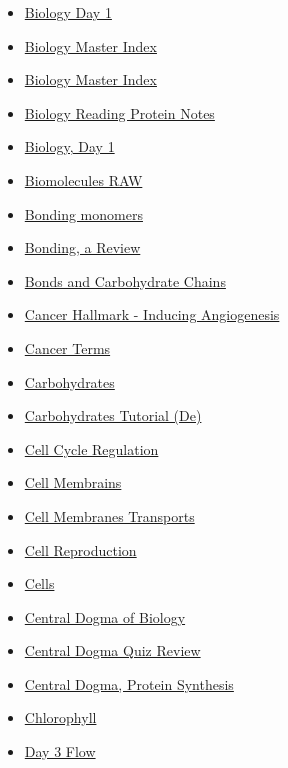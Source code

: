 \documentclass[11pt]{article}
\begin{document}
\begin{itemize}
\begin{itemize}
\begin{itemize}
\item \href{biology/bio10/KBhBIO101Day1.org}{Biology Day 1}
\item \href{biology/bio10/index.org}{Biology Master Index}
\item \href{biology/bio10/KBBiologyMasterIndex.org}{Biology Master Index}
\item \href{biology/bio10/KBBIO101ProteinReading.org}{Biology Reading Protein Notes}
\item \href{biology/bio10/KBhBIO101LetsDoBio.org}{Biology, Day 1}
\item \href{biology/bio10/KBhBIO201BioMoleculesRAW.org}{Biomolecules RAW}
\item \href{biology/bio10/KBe20bio101refBondingMonomers.org}{Bonding monomers}
\item \href{biology/bio10/KBhBIO101BondingReview.org}{Bonding, a Review}
\item \href{biology/bio10/KB20200911095443.org}{Bonds and Carbohydrate Chains}
\item \href{biology/bio10/cancer\_angiogenesis.org}{Cancer Hallmark - Inducing Angiogenesis}
\item \href{biology/bio10/KBrefCancerVocab.org}{Cancer Terms}
\item \href{biology/bio10/KBhBIO101Carbs.org}{Carbohydrates}
\item \href{biology/bio10/KB20200905180226.org}{Carbohydrates Tutorial (De)}
\item \href{biology/bio10/KBhBIO101CellCycleRegulation.org}{Cell Cycle Regulation}
\item \href{biology/bio10/KBhBIO101CellMembraines.org}{Cell Membrains}
\item \href{biology/bio10/KbhBIO101CellTransport.org}{Cell Membranes Transports}
\item \href{biology/bio10/KBhBIO101CellReproduction.org}{Cell Reproduction}
\item \href{biology/bio10/KBhBIO101Cells.org}{Cells}
\item \href{biology/bio10/KBBIO101CentralDogma.org}{Central Dogma of Biology}
\item \href{biology/bio10/KBhBIO101CentralDogmaQuizReview.org}{Central Dogma Quiz Review}
\item \href{biology/bio10/KBhBIO101CentralDogma.org}{Central Dogma, Protein Synthesis}
\item \href{biology/bio10/KBerefChlorophyll.org}{Chlorophyll}
\item \href{biology/bio10/20bio201floD3.org}{Day 3 Flow}

\end{itemize}
\end{itemize}
\end{itemize}
\end{document}
